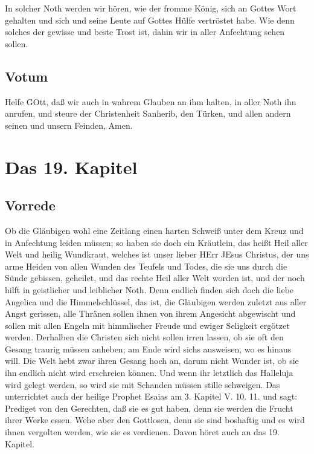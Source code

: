 In solcher Noth werden wir hören, wie der fromme König, sich an Gottes Wort gehalten und sich und seine Leute auf Gottes Hülfe vertröstet habe. Wie denn solches der gewisse und beste Trost ist, dahin wir in aller Anfechtung sehen sollen.

\section{Votum}

Helfe GOtt, daß wir auch in wahrem Glauben an ihm halten, in aller Noth ihn anrufen, und steure der Christenheit Sanherib, den Türken, und allen andern seinen und unsern Feinden, Amen.

\chapter{Das 19. Kapitel}

\section{Vorrede}

Ob die Gläubigen wohl eine Zeitlang einen harten Schweiß unter dem Kreuz und in Anfechtung leiden müssen; so haben sie doch ein Kräutlein, das heißt Heil aller Welt und heilig Wundkraut, welches ist unser lieber HErr JEsus Christus, der uns arme Heiden von allen Wunden des Teufels und Todes, die sie uns durch die Sünde gebissen, geheilet, und das rechte Heil aller Welt worden ist, und der noch hilft in geistlicher und leiblicher Noth. Denn endlich finden sich doch die liebe Angelica und die Himmelschlüssel, das ist, die Gläubigen werden zuletzt aus aller Angst gerissen, alle Thränen sollen ihnen von ihrem Angesicht abgewischt und sollen mit allen Engeln mit himmlischer Freude und ewiger Seligkeit ergötzet werden. Derhalben die Christen sich nicht sollen irren lassen, ob sie oft den Gesang traurig müssen anheben; am Ende wird sichs ausweisen, wo es hinaus will. Die Welt hebt zwar ihren Gesang hoch an, darum nicht Wunder ist, ob sie ihn endlich nicht wird erschreien können. Und wenn ihr letztlich das Halleluja wird gelegt werden, so wird sie mit Schanden müssen stille schweigen. Das unterrichtet auch der heilige Prophet Esaias am 3. Kapitel V. 10. 11. und sagt: Prediget von den Gerechten, daß sie es gut haben, denn sie werden die Frucht ihrer Werke essen. Wehe aber den Gottlosen, denn sie sind boshaftig und es wird ihnen vergolten werden, wie sie es verdienen. Davon höret auch an das 19. Kapitel.

